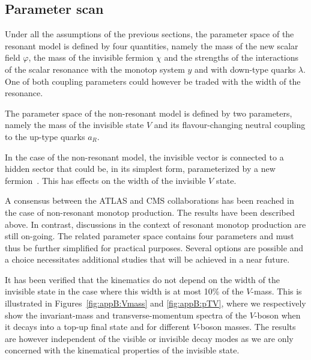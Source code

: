 \subsection{Parameter scan}

Under all the assumptions of the previous sections, the parameter space of
the resonant model is defined by four quantities, namely the mass of the
new scalar field $\varphi$, the mass of the invisible fermion $\chi$ and
the strengths of the interactions of the scalar resonance with the monotop
system $y$ and with down-type quarks $\lambda$. One of both coupling
parameters could however be traded with the width of the resonance.

The parameter space of the non-resonant model is defined by two
parameters, namely the mass of the invisible state $V$ and its
flavour-changing neutral coupling to the up-type quarks $a_R$.
      
%

In the case of the non-resonant model, the invisible vector is connected to
a hidden sector that could be, in its simplest form, parameterized by a new
fermion~\cite{Boucheneb:2014wza}. This has effects on the width of the invisible $V$ state.


A consensus between the ATLAS and CMS collaborations has been reached in
the case of non-resonant monotop production. The results have been
described above. In contrast, discussions in the context of resonant
monotop production are still on-going. The related parameter space
contains four parameters and must thus be further simplified for practical
purposes. Several options are possible and a choice necessitates additional
studies that will be achieved in a near future.



It has been verified that the kinematics do not depend on the width of the
invisible state in the case where this width is at most 10\% of the
$V$-mass. This is illustrated in Figures~\ref{fig:appB:Vmass} and \ref{fig:appB:pTV},
where we respectively show the invariant-mass and transverse-momentum
spectra of the $V$-boson when it decays into a top-up final state and for
different $V$-boson masses. The results are however independent of the
visible or invisible decay modes as we are only concerned with the
kinematical properties of the invisible state.


